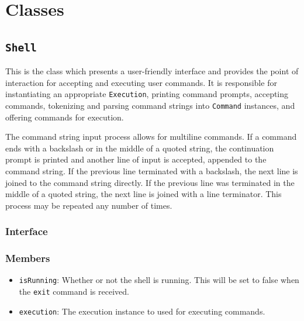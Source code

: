 \documentclass{article}
\begin{document}
  \section{Classes}

  \subsection{\texttt{Shell}}

  This is the class which presents a user-friendly interface and
  provides the point of interaction for accepting and executing user
  commands.  It is responsible for instantiating an appropriate
  \texttt{Execution}, printing command prompts, accepting commands,
  tokenizing and parsing command strings into \texttt{Command}
  instances, and offering commands for execution.

  The command string input process allows for multiline commands.  If a
  command ends with a backslash or in the middle of a quoted string, the
  continuation prompt is printed and another line of input is accepted,
  appended to the command string.  If the previous line terminated with
  a backslash, the next line is joined to the command string directly.
  If the previous line was terminated in the middle of a quoted string,
  the next line is joined with a line terminator.  This process may be
  repeated any number of times.

  \subsubsection{Interface}
  

  \subsubsection{Members}
  \begin{itemize}
    \item \texttt{isRunning}: Whether or not the shell is running.  This
      will be set to false when the \texttt{exit} command is received.
    \item \texttt{execution}: The execution instance to used for
      executing commands.
  \end{itemize}
\end{document}
